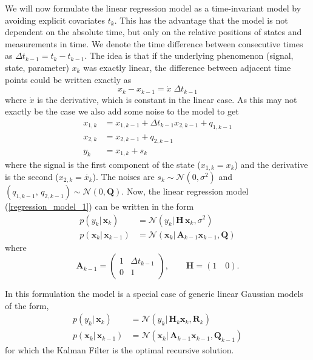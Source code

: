 We will now formulate the
linear regression model as a time-invariant model
by avoiding explicit covariates $t_k$.
This has the advantage that the model is not dependent on
the absolute time, but only on the relative positions of states
and measurements in time.
We denote the time difference between consecutive times as
$\Delta t_{k-1} = t_k - t_{k-1}$. The idea is that if
the underlying phenomenon (signal, state, parameter) $x_k$ was
exactly linear, the difference between adjacent time points could be
written exactly as
$$ x_k - x_{k-1} = \dot{x} \; \Delta t_{k-1} $$
where $\dot{x}$ is the derivative, which is constant in the linear case.
As this may not exactly be the case we also add some noise to the model
to get
\begin{align*}
  x_{1,k} &= x_{1,k-1} + \Delta t_{k-1} x_{2,k-1} + q_{1,k-1} \\
  x_{2,k} &= x_{2,k-1} + q_{2,k-1} \\
  y_k &= x_{1,k} + s_k
\end{align*}
where the signal is the first component of the state
($x_{1,k} = x_k$) and the derivative is the second
($x_{2,k} = \dot{x_k}$).
The noises are $s_k \sim \mathcal{N}(0, \sigma^2)$ and
$(q_{1,k-1},\, q_{2,k-1}) \sim \mathcal{N}(0,\mathbf{Q})$.
Now, the linear regression model (\ref{regression_model_1}) can be written
in the form
\begin{align*}
  p(y_k |\, \mathbf{x}_k) &= \mathcal{N}(y_k |\, \mathbf{H} \,
                          \mathbf{x}_k, \sigma^2) \\
  p(\mathbf{x}_k |\, \mathbf{x}_{k-1}) &= \mathcal{N}(\mathbf{x}_k | \,
                                       \mathbf{A}_{k-1} \mathbf{x}_{k-1},
                                       \mathbf{Q})
\end{align*}
where
$$
\mathbf{A}_{k-1} =
\begin{pmatrix}
  1 & \Delta t_{k-1} \\
  0 & 1
\end{pmatrix}, \quad \quad \mathbf{H} = (1 \quad 0).
$$

In this formulation the model is a special case of generic linear Gaussian
models of the form, 
\begin{align*}
  p(y_k |\, \mathbf{x}_k) &= \mathcal{N}(y_k |\, \mathbf{H}_k \mathbf{x}_k,
                          \mathbf{R}_k) \\
  p(\mathbf{x}_k |\, \mathbf{x}_{k-1}) &= \mathcal{N}(\mathbf{x}_k
                                      |\, \mathbf{A}_{k-1} \mathbf{x}_{k-1},
                                      \mathbf{Q}_{k-1})
\end{align*}
for which the Kalman Filter \citep{Kalman:1960} is the optimal recursive
solution.

